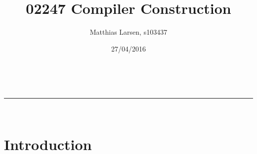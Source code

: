 \documentclass[a4paper,11pt]{article}
\makeatletter
\newcommand{\linia}{\rule{\linewidth}{0.5pt}}
\theoremstyle{mytheor}
\renewcommand{\maketitle}{
\begin{center}
\vspace{2ex}
{\huge \textsc{\@title}}
\vspace{1ex}
\\
\linia\\
\@author \hfill \@date
\vspace{4ex}
\end{center}
}
\makeatother
\begin{document}
\title{02247 Compiler Construction}

\author{Matthias Larsen, s103437}

\date{27/04/2016}

\maketitle










\section*{Introduction}
\end{document}
